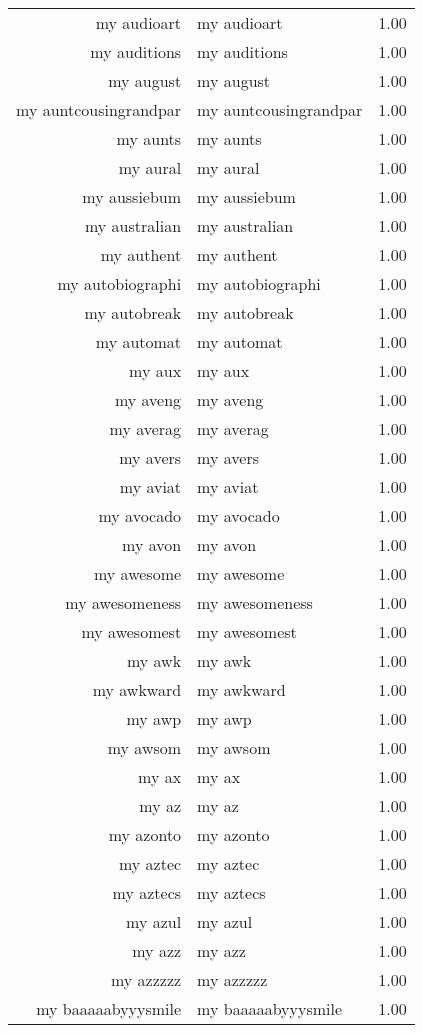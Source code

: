 \begin{table}[ht]
\begin{tabular}{rlr}
  my audioart & my audioart & 1.00 \\ 
  my auditions & my auditions & 1.00 \\ 
  my august & my august & 1.00 \\ 
  my auntcousingrandpar & my auntcousingrandpar & 1.00 \\ 
  my aunts & my aunts & 1.00 \\ 
  my aural & my aural & 1.00 \\ 
  my aussiebum & my aussiebum & 1.00 \\ 
  my australian & my australian & 1.00 \\ 
  my authent & my authent & 1.00 \\ 
  my autobiographi & my autobiographi & 1.00 \\ 
  my autobreak & my autobreak & 1.00 \\ 
  my automat & my automat & 1.00 \\ 
  my aux & my aux & 1.00 \\ 
  my aveng & my aveng & 1.00 \\ 
  my averag & my averag & 1.00 \\ 
  my avers & my avers & 1.00 \\ 
  my aviat & my aviat & 1.00 \\ 
  my avocado & my avocado & 1.00 \\ 
  my avon & my avon & 1.00 \\ 
  my awesome & my awesome & 1.00 \\ 
  my awesomeness & my awesomeness & 1.00 \\ 
  my awesomest & my awesomest & 1.00 \\ 
  my awk & my awk & 1.00 \\ 
  my awkward & my awkward & 1.00 \\ 
  my awp & my awp & 1.00 \\ 
  my awsom & my awsom & 1.00 \\ 
  my ax & my ax & 1.00 \\ 
  my az & my az & 1.00 \\ 
  my azonto & my azonto & 1.00 \\ 
  my aztec & my aztec & 1.00 \\ 
  my aztecs & my aztecs & 1.00 \\ 
  my azul & my azul & 1.00 \\ 
  my azz & my azz & 1.00 \\ 
  my azzzzz & my azzzzz & 1.00 \\ 
  my baaaaabyyysmile & my baaaaabyyysmile & 1.00 \\ 

\end{tabular}
\end{table}
